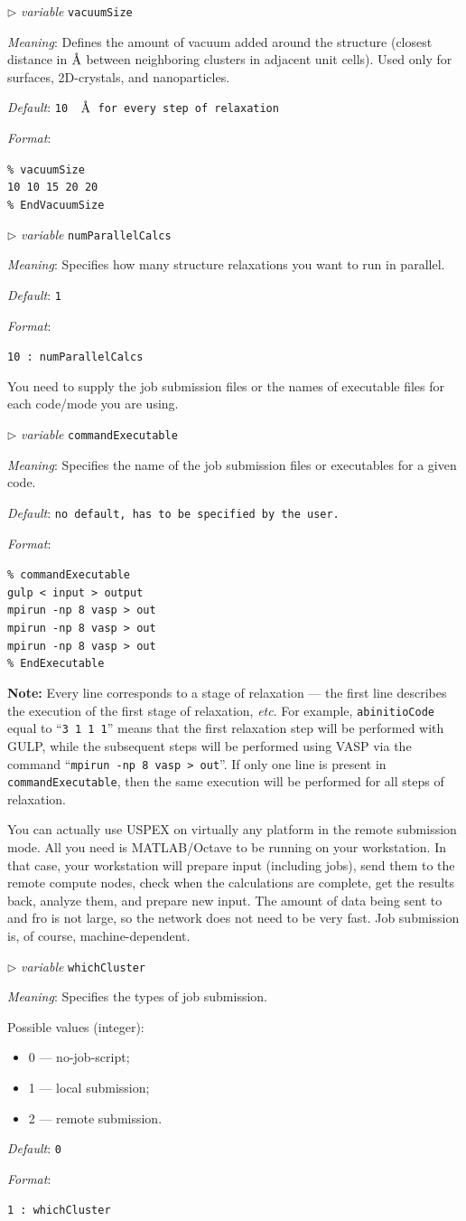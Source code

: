 \documentclass[12pt]{article}
\newcommand{\keyword}[1]{\texttt{#1}}
\newcommand{\paramacro}[6]{
\vspace{0.5cm}
$\triangleright$ \emph{variable} {\color{blue} \texttt{#1}}

\emph{Meaning}: {#2}

{#3}

\emph{Default}: \texttt{#4}

\emph{Format}:

{\addtolength{\leftskip}{10mm} 
\texttt{#5}
\par}


{\small #6}

}
\begin{document}
\paramacro{vacuumSize}{Defines the amount of vacuum added around the structure
(closest distance in $\text{\r{A}}$ between neighboring clusters in adjacent
unit cells). Used only for surfaces, 2D-crystals, and nanoparticles.}{}{10 {\rm
$\text{\r{A}}$ for every step of relaxation}}{\% vacuumSize \\
10 10 15 20 20 \\
\% EndVacuumSize}{}


\paramacro{numParallelCalcs}{Specifies how many structure relaxations you want
to run in parallel.}{}{1}{10   : numParallelCalcs}{}

You need to supply the job submission files or the names of executable files for
each code/mode you are using.


\paramacro{commandExecutable}{Specifies the name of the job submission files or
executables for a given code.}{}{\rm no default, has to be specified by the
user.}{\% commandExecutable \\
gulp < input > output \\
mpirun -np 8 vasp > out \\
mpirun -np 8 vasp > out \\
mpirun -np 8 vasp > out \\
\% EndExecutable}{\textbf{Note:} Every line corresponds to a stage of relaxation
--- the first line describes the execution of the first stage of relaxation,
\emph{etc}. For example, \keyword{abinitioCode} equal to ``\texttt{3 1 1 1}''
means that the first relaxation step will be performed with GULP, while the
subsequent steps will be performed using VASP via the command ``\texttt{mpirun
-np 8 vasp > out}''. If only one line is present in \keyword{commandExecutable},
then the same execution will be performed for all steps of relaxation.}

\vspace{0.5cm}

You can actually use USPEX on virtually any platform in the remote submission
mode. All you need is MATLAB/Octave to be running on your workstation. In that
case, your workstation will prepare input (including jobs), send them to the
remote compute nodes, check when the calculations are complete, get the results
back, analyze them, and prepare new input. The amount of data being sent to and
fro is not large, so the network does not need to be very fast. Job submission
is, of course, machine-dependent.

\paramacro{whichCluster}{Specifies the types of job submission.}{
Possible values (integer):
\begin{itemize}
\item 0 --- no-job-script;
\item 1 --- local submission;
\item 2 --- remote submission.
\end{itemize}}{0}{1     : whichCluster}{}
\end{document}
